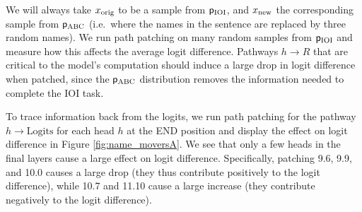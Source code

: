 We will always take $x_{\mathrm{orig}}$ to be a sample from $\mathsf{p}_{\mathrm{IOI}}$, and $x_{\mathrm{new}}$ the corresponding
sample from $\mathsf{p}_{\mathrm{ABC}}$ (i.e.~where the names in the sentence are replaced by three random names). We run
path patching on many random samples from $\mathsf{p}_{\mathrm{IOI}}$ and measure how this affects the average logit difference. Pathways $h \to R$ that are critical to the model's computation should induce a large drop in logit difference when patched, since the $\mathsf{p}_{\mathrm{ABC}}$ distribution removes the information needed to complete the IOI task.

To trace information back from the logits, we run path patching for the pathway $h \to \text{Logits}$ for each head $h$ at the END position and display the effect on logit difference in Figure \ref{fig:name_moversA}.
We see that only a few heads in the final layers cause a large effect on logit difference. Specifically, patching 9.6, 9.9, and 10.0 causes a large drop (they thus contribute positively to the logit difference), while 10.7 and 11.10 cause a large increase (they contribute negatively to the logit difference).


%

